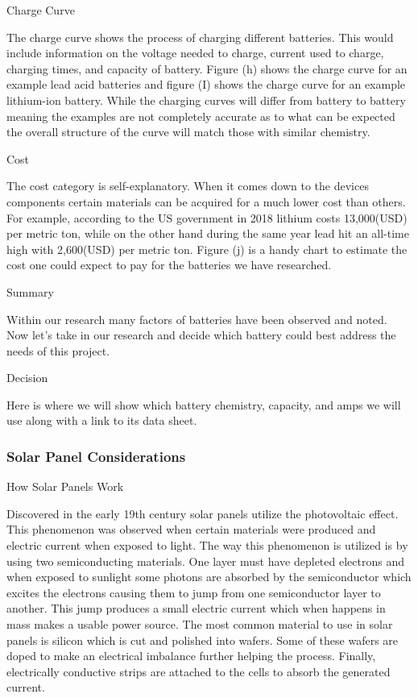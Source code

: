 Charge Curve 

The charge curve shows the process of charging different batteries. This would include information on the voltage needed to charge, current used to charge, charging times, and capacity of battery. Figure (h) shows the charge curve for an example lead acid batteries and figure (I) shows the charge curve for an example lithium-ion battery. While the charging curves will differ from battery to battery meaning the examples are not completely accurate as to what can be expected the overall structure of the curve will match those with similar chemistry. 

Cost 

The cost category is self-explanatory. When it comes down to the devices components certain materials can be acquired for a much lower cost than others. For example, according to the US government in 2018 lithium costs 13,000(USD) per metric ton, while on the other hand during the same year lead hit an all-time high with 2,600(USD) per metric ton. Figure (j) is a handy chart to estimate the cost one could expect to pay for the batteries we have researched. 

Summary 

Within our research many factors of batteries have been observed and noted. Now let's take in our research and decide which battery could best address the needs of this project. 

Decision 

Here is where we will show which battery chemistry, capacity, and amps we will use along with a link to its data sheet. 

\subsubsection{Solar Panel Considerations}
How Solar Panels Work 

Discovered in the early 19th century solar panels utilize the photovoltaic effect. This phenomenon was observed when certain materials were produced and electric current when exposed to light. The way this phenomenon is utilized is by using two semiconducting materials. One layer must have depleted electrons and when exposed to sunlight some photons are absorbed by the semiconductor which excites the electrons causing them to jump from one semiconductor layer to another. This jump produces a small electric current which when happens in mass makes a usable power source. The most common material to use in solar panels is silicon which is cut and polished into wafers. Some of these wafers are doped to make an electrical imbalance further helping the process. Finally, electrically conductive strips are attached to the cells to absorb the generated current. 

